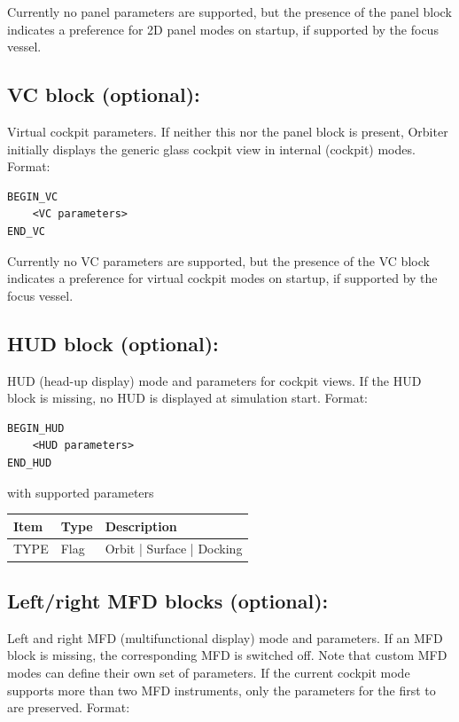 \documentclass[Orbiter Developer Manual.tex]{subfiles}
\begin{document}
\noindent
Currently no panel parameters are supported, but the presence of the panel block indicates a preference for 2D panel modes on startup, if supported by the focus vessel.


\subsection*{VC block (optional):}
Virtual cockpit parameters. If neither this nor the panel block is present, Orbiter initially displays the generic glass cockpit view in internal (cockpit) modes. Format:

\begin{lstlisting}[language=OSFS]
BEGIN_VC
	<VC parameters>
END_VC
\end{lstlisting}

\noindent
Currently no VC parameters are supported, but the presence of the VC block indicates a preference for virtual cockpit modes on startup, if supported by the focus vessel.


\subsection*{HUD block (optional):}
HUD (head-up display) mode and parameters for cockpit views. If the HUD block is missing, no HUD is displayed at simulation start. Format:

\begin{lstlisting}[language=OSFS]
BEGIN_HUD
	<HUD parameters>
END_HUD
\end{lstlisting}

\noindent
with supported parameters

\begin{table}[H]
	\centering
	\begin{tabularx}{\textwidth}{ |l|l|X| }
	\hline\rule{0pt}{2ex}
	\textbf{Item} & \textbf{Type} & \textbf{Description}\\
	\hline\rule{0pt}{2ex}
	TYPE & Flag & Orbit | Surface | Docking\\
	\hline
	\end{tabularx}
\end{table}

\subsection*{Left/right MFD blocks (optional):}
Left and right MFD (multifunctional display) mode and parameters. If an MFD block is missing, the corresponding MFD is switched off. Note that custom MFD modes can define their own set of parameters. If the current cockpit mode supports more than two MFD instruments, only the parameters for the first to are preserved. Format:
\end{document}
